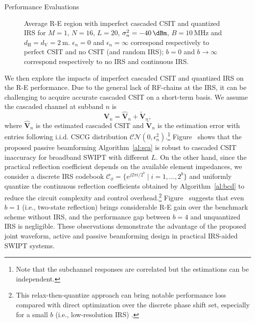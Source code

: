 \documentclass[journal]{IEEEtran}
\begin{document}
\begin{section}{Performance Evaluations}
		\begin{figure}[!t]
			\centering
			\caption{Average R-E region with imperfect cascaded CSIT and quantized IRS for $M=1$, $N=16$, $L=20$, $\sigma_n^2=\SI{-40}{\dBm}$, $B=\SI{10}{\MHz}$ and $d_{\mathrm{H}}=d_{\mathrm{V}}=\SI{2}{\meter}$. $\epsilon_{n}=0$ and $\epsilon_{n}=\infty$ correspond respectively to perfect CSIT and no CSIT (and random IRS); $b=0$ and $b \to \infty$ correspond respectively to no IRS and continuous IRS.}
		\end{figure}

		We then explore the impacts of imperfect cascaded CSIT and quantized IRS on the R-E performance. Due to the general lack of RF-chains at the IRS, it can be challenging to acquire accurate cascaded CSIT on a short-term basis. We assume the cascaded channel at subband $n$ is
		\begin{equation}
			\boldsymbol{V}_{n} = \hat{\boldsymbol{V}}_{n} + \tilde{\boldsymbol{V}}_{n},
		\end{equation}
		where $\hat{\boldsymbol{V}}_{n}$ is the estimated cascaded CSIT and $\tilde{\boldsymbol{V}}_{n}$ is the estimation error with entries following i.i.d. CSCG distribution $\mathcal{CN}(0, \epsilon_{n}^2)$.\footnote{Note that the subchannel responses are correlated but the estimations can be independent.} Figure~ shows that the proposed passive beamforming Algorithm~\ref{al:sca} is robust to cascaded CSIT inaccuracy for broadband SWIPT with different $L$. On the other hand, since the practical reflection coefficient depends on the available element impedances, we consider a discrete IRS codebook $\mathcal{C}_\phi = \{e^{j 2 \pi i / 2^b} \mid i = 1, \dots, 2^b\}$ and uniformly quantize the continuous reflection coefficients obtained by Algorithm~\ref{al:bcd} to reduce the circuit complexity and control overhead.\footnote{This relax-then-quantize approach can bring notable performance loss compared with direct optimization over the discrete phase shift set, especially for a small $b$ (i.e., low-resolution IRS) \cite{Wu2020c}.} Figure~ suggests that even $b=1$ (i.e., two-state reflection) brings considerable R-E gain over the benchmark scheme without IRS, and the performance gap between $b=4$ and unquantized IRS is negligible. These observations demonstrate the advantage of the proposed joint waveform, active and passive beamforming design in practical IRS-aided SWIPT systems.
	\end{section}
\end{document}
